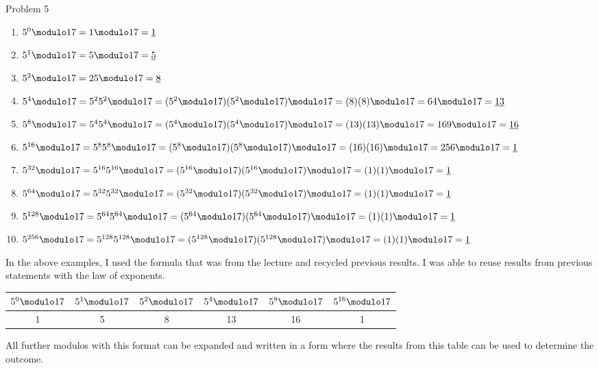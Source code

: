 \begin{problem}{Problem 5}
    \begin{highlight}[Solution]
        \begin{enumerate}[label = (\alph*)]
            \item $5^{0} \modulo 17 = 1 \modulo 17 = \underbar{1}$
            \item $5^{1} \modulo 17 = 5 \modulo 17 = \underbar{5}$
            \item $5^{2} \modulo 17 = 25 \modulo 17 = \underbar{8}$
            \item $5^{4} \modulo 17 = 5^{2}5^{2} \modulo 17 = (5^{2} \modulo 17)(5^{2} \modulo 17) \modulo 17 = (8)(8) \modulo 17 = 64 \modulo 17 = \underbar{13}$
            \item $5^{8} \modulo 17 = 5^{4}5^{4} \modulo 17 = (5^{4} \modulo 17)(5^{4} \modulo 17) \modulo 17 = (13)(13) \modulo 17 = 169 \modulo 17 = \underbar{16}$
            \item $5^{16} \modulo 17 = 5^{8}5^{8} \modulo 17 = (5^{8} \modulo 17)(5^{8} \modulo 17) \modulo 17 = (16)(16) \modulo 17 =  256 \modulo 17 = \underbar{1}$
            \item $5^{32} \modulo 17 = 5^{16}5^{16} \modulo 17 = (5^{16} \modulo 17)(5^{16} \modulo 17) \modulo 17 = (1)(1) \modulo 17 = \underbar{1}$
            \item $5^{64} \modulo 17 = 5^{32}5^{32} \modulo 17 = (5^{32} \modulo 17)(5^{32} \modulo 17) \modulo 17 = (1)(1) \modulo 17 = \underbar{1}$
            \item $5^{128} \modulo 17 = 5^{64}5^{64} \modulo 17 = (5^{64} \modulo 17)(5^{64} \modulo 17) \modulo 17 = (1)(1) \modulo 17 = \underbar{1}$
            \item $5^{256} \modulo 17 = 5^{128}5^{128} \modulo 17 = (5^{128} \modulo 17)(5^{128} \modulo 17) \modulo 17 = (1)(1) \modulo 17 = \underbar{1}$
        \end{enumerate}
    \end{highlight}

    \begin{highlight}[Synopsis]
        In the above examples, I used the formula that was from the lecture and recycled previous results. I was able to reuse results from previous statements with the law of exponents.

        \begin{center}
            \begin{tabular}[ht]{|c|c|c|c|c|c|}
                \hline $5^{0} \modulo 17$ & $5^{1} \modulo 17$ & $5^{2} \modulo 17$ & $5^{4} \modulo 17$ & $5^{8} \modulo 17$ & $5^{16} \modulo 17$ \\ \hline
                1 & 5 & 8 & 13 & 16 & 1 \\ \hline
            \end{tabular}
        \end{center}
        All further modulos with this format can be expanded and written in a form where the results from this table can be used to determine the outcome.
    \end{highlight}
\end{problem}

